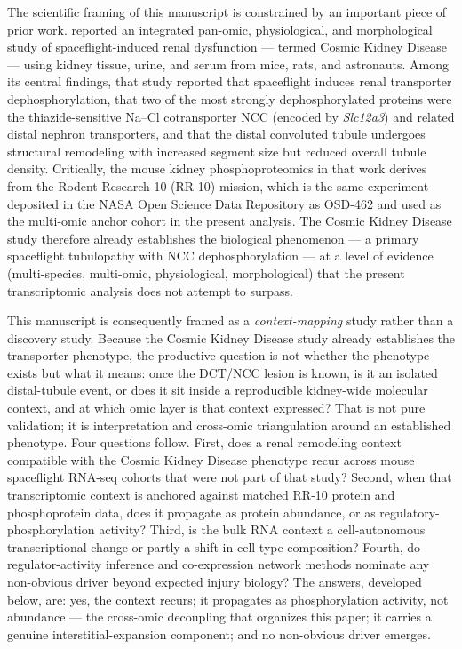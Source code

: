\documentclass[11pt]{article}
\newcommand{\gene}[1]{\textit{#1}}
\begin{document}
The scientific framing of this manuscript is constrained by an important piece of prior work. \citet{siew2024cosmic} reported an integrated pan-omic, physiological, and morphological study of spaceflight-induced renal dysfunction --- termed Cosmic Kidney Disease --- using kidney tissue, urine, and serum from mice, rats, and astronauts. Among its central findings, that study reported that spaceflight induces renal transporter dephosphorylation, that two of the most strongly dephosphorylated proteins were the thiazide-sensitive Na--Cl cotransporter NCC (encoded by \gene{Slc12a3}) and related distal nephron transporters, and that the distal convoluted tubule undergoes structural remodeling with increased segment size but reduced overall tubule density. Critically, the mouse kidney phosphoproteomics in that work derives from the Rodent Research-10 (RR-10) mission, which is the same experiment deposited in the NASA Open Science Data Repository as OSD-462 and used as the multi-omic anchor cohort in the present analysis. The Cosmic Kidney Disease study therefore already establishes the biological phenomenon --- a primary spaceflight tubulopathy with NCC dephosphorylation --- at a level of evidence (multi-species, multi-omic, physiological, morphological) that the present transcriptomic analysis does not attempt to surpass.

This manuscript is consequently framed as a \emph{context-mapping} study rather than a discovery study. Because the Cosmic Kidney Disease study already establishes the transporter phenotype, the productive question is not whether the phenotype exists but what it means: once the DCT/NCC lesion is known, is it an isolated distal-tubule event, or does it sit inside a reproducible kidney-wide molecular context, and at which omic layer is that context expressed? That is not pure validation; it is interpretation and cross-omic triangulation around an established phenotype. Four questions follow. First, does a renal remodeling context compatible with the Cosmic Kidney Disease phenotype recur across mouse spaceflight RNA-seq cohorts that were not part of that study? Second, when that transcriptomic context is anchored against matched RR-10 protein and phosphoprotein data, does it propagate as protein abundance, or as regulatory-phosphorylation activity? Third, is the bulk RNA context a cell-autonomous transcriptional change or partly a shift in cell-type composition? Fourth, do regulator-activity inference and co-expression network methods nominate any non-obvious driver beyond expected injury biology? The answers, developed below, are: yes, the context recurs; it propagates as phosphorylation activity, not abundance --- the cross-omic decoupling that organizes this paper; it carries a genuine interstitial-expansion component; and no non-obvious driver emerges.
\end{document}
